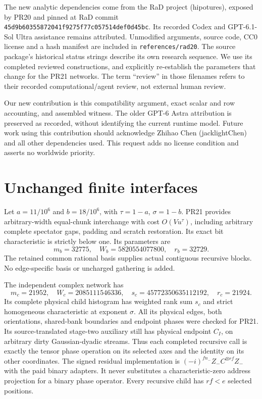 \documentclass[11pt]{article}
\begin{document}
The new analytic dependencies come from the RaD project (hipotures),
exposed by PR20 and pinned at RaD commit
\texttt{45d9b60355872041f9275f77c057514def0d45bc}.
Its recorded Codex and GPT-6.1-Sol Ultra assistance remains attributed.
Unmodified arguments, source code, CC0 license and a hash manifest are
included in \texttt{references/rad20}. The source package's historical
status strings describe its own research sequence. We use its completed
reviewed constructions, and explicitly re-establish the parameters that
change for the PR21 networks. The term ``review'' in those filenames refers
to their recorded computational/agent review, not external human review.

Our new contribution is this compatibility argument, exact scalar and row
accounting, and assembled witness. The older GPT-6 Astra attribution is
preserved as recorded, without identifying the current runtime model.
Future work using this contribution should acknowledge Zhihao Chen
(jacklightChen) and all other dependencies used. This request adds no
license condition and asserts no worldwide priority.

\section{Unchanged finite interfaces}
Let $a=11/10^6$ and $b=18/10^6$, with $\tau=1-a$, $\sigma=1-b$.
PR21 provides arbitrary-width equal-chunk interchange with cost
$O(Vu^\tau)$, including arbitrary complete spectator gaps, padding and
scratch restoration. Its exact bit characteristic is strictly below one.
Its parameters are
\[
 m_b=32775,\quad W_b=5820554077800,\quad r_b=32729.
\]
The retained common rational basis supplies actual contiguous recursive
blocks. No edge-specific basis or uncharged gathering is added.

The independent complex network has
\[
 m_c=21952,\quad W_c=2085111546336,\quad
 s_c=45772350635112192,\quad r_c=21924.
\]
Its complete physical child histogram has weighted rank sum $s_c$ and
strict homogeneous characteristic at exponent $\sigma$. All its physical
edges, both orientations, shared-bank boundaries and endpoint phases were
checked for PR21. Its source-translated stage-two auxiliary still has
physical endpoint $C_I$, on arbitrary dirty Gaussian-dyadic streams.
Thus each completed recursive call is exactly the tensor phase operation
on its selected axes and the identity on its other coordinates.
The signed residual implementation is
$(-i)^{f n_-}Z_- C^{\otimes rf}Z_-$ with the paid binary adapters.
It never substitutes a characteristic-zero address projection for a binary
phase operator. Every recursive child has $rf<e$ selected positions.
\end{document}

